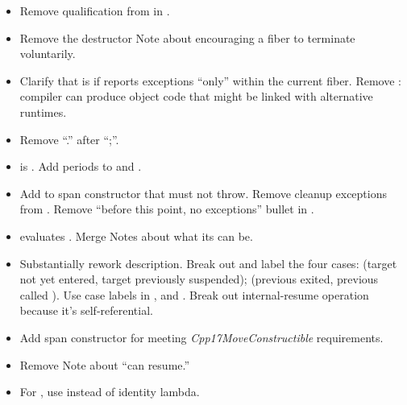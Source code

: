 \begin{itemize}
    \item Remove  qualification from  in \effects.
    \item Remove the destructor Note about encouraging a fiber to terminate
          voluntarily.
    \item Clarify that  is \true if
          \curex reports exceptions ``only'' within the current fiber.
          Remove : compiler can produce object code that might
          be linked with alternative runtimes.
    \item Remove ``.'' after ``;''.
    \item \resumewith\xspace\mandates\xspace{} is \true.
          Add periods to \mandates and \precond.
    \item Add \precond to span constructor that  must not throw.
          Remove cleanup exceptions from \resumewith \xspace \except. Remove
          ``before this point, no exceptions'' bullet in \effects.\
    \item \resumewith evaluates . Merge Notes about what
          its \cpp{returned} can be.
    \item Substantially rework \resumewith description. Break out and label
          the four cases: (target not yet entered, target previously
          suspended); (previous exited, previous called \resumewith). Use case
          labels in \effects, \returns and \except. Break out internal-resume
          operation because it's self-referential.
    \item Add span constructor \precond for 
          meeting \emph{Cpp17MoveConstructible} requirements.
    \item Remove \canresume Note about ``can resume.''
    \item For \resume, use  instead of identity lambda.
\end{itemize}



